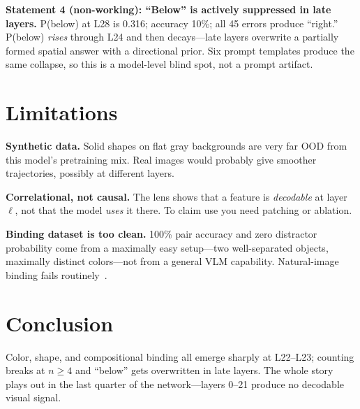 \documentclass{article}
\begin{document}
\textbf{Statement 4 (non-working): ``Below'' is actively suppressed in late layers.}
P(below) at L28 is 0.316; accuracy 10\%; all 45 errors produce ``right.''
P(below) \emph{rises} through L24 and then decays---late layers overwrite a partially formed spatial answer with a directional prior.
Six prompt templates produce the same collapse, so this is a model-level blind spot, not a prompt artifact.

\section{Limitations}
\label{sec:limitations}

\textbf{Synthetic data.}
Solid shapes on flat gray backgrounds are very far OOD from this model's pretraining mix.
Real images would probably give smoother trajectories, possibly at different layers.

\textbf{Correlational, not causal.}
The lens shows that a feature is \emph{decodable} at layer $\ell$, not that the model \emph{uses} it there.
To claim use you need patching or ablation.

\textbf{Binding dataset is too clean.}
100\% pair accuracy and zero distractor probability come from a maximally easy setup---two well-separated objects, maximally distinct colors---not from a general VLM capability.
Natural-image binding fails routinely~\citep{yuksekgonul2023aro}.

\section{Conclusion}

Color, shape, and compositional binding all emerge sharply at L22--L23; counting breaks at $n\ge4$ and ``below'' gets overwritten in late layers.
The whole story plays out in the last quarter of the network---layers 0--21 produce no decodable visual signal.



\end{document}
